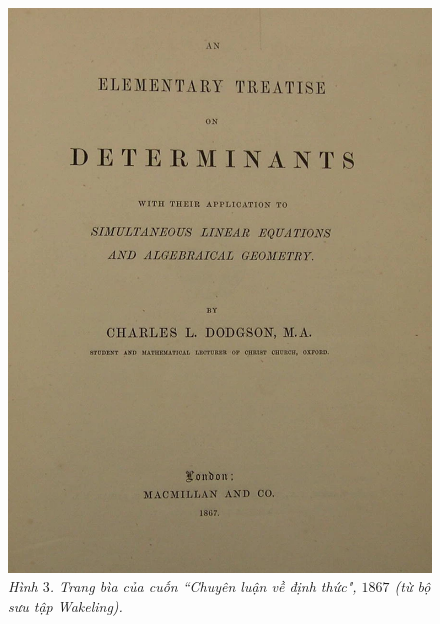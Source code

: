\begin{multicols}{2}
	\begin{figure}[H]
		\vspace*{-5pt}
		\centering
		\captionsetup{labelformat= empty, justification=centering}
		\includegraphics[width= 1\linewidth]{3}
		\caption{\small\textit{\color{quantoan}Hình $3$. Trang bìa của cuốn ``Chuyên luận về định thức", $1867$ (từ bộ sưu tập Wakeling).}}
		\vspace*{-10pt}
	\end{figure}

\end{multicols}
